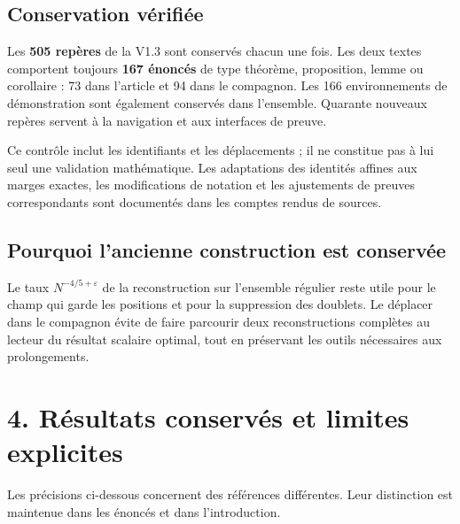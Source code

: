 \documentclass[11pt,a4paper]{article}
\newcommand{\eps}{\varepsilon}
\begin{document}
\subsection*{Conservation vérifiée}
Les \textbf{505 repères} de la V1.3 sont conservés chacun une fois.
Les deux textes comportent toujours \textbf{167 énoncés} de type théorème,
proposition, lemme ou corollaire : 73 dans l'article et 94 dans le compagnon.
Les 166 environnements de démonstration sont également conservés dans
l'ensemble. Quarante nouveaux repères servent à la navigation et aux
interfaces de preuve.

Ce contrôle inclut les identifiants et les déplacements ; il ne constitue
pas à lui seul une validation mathématique. Les adaptations des identités
affines aux marges exactes, les modifications de notation et les ajustements
de preuves correspondants sont documentés dans les comptes rendus de sources.

\subsection*{Pourquoi l'ancienne construction est conservée}
Le taux \(N^{-4/5+\eps}\) de la reconstruction sur l'ensemble régulier
reste utile pour le champ qui garde les positions et pour la suppression
des doublets. Le déplacer dans le compagnon évite de faire parcourir
deux reconstructions complètes au lecteur du résultat scalaire optimal,
tout en préservant les outils nécessaires aux prolongements.

\clearpage
\section*{4. Résultats conservés et limites explicites}
Les précisions ci-dessous concernent des références différentes. Leur
distinction est maintenue dans les énoncés et dans l'introduction.
\end{document}
